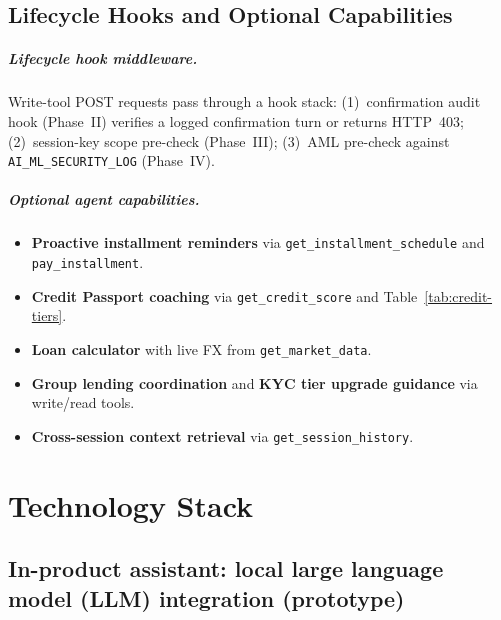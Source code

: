 \documentclass[12pt,a4paper]{report}
\begin{document}
\section{Lifecycle Hooks and Optional Capabilities}

\paragraph{Lifecycle hook middleware.}
Write-tool POST requests pass through a hook stack: (1)~confirmation audit hook (Phase~II) verifies a logged confirmation turn or returns HTTP~403; (2)~session-key scope pre-check (Phase~III); (3)~AML pre-check against \texttt{AI\_ML\_SECURITY\_LOG} (Phase~IV).

\paragraph{Optional agent capabilities.}
\begin{itemize}[noitemsep]
\item \textbf{Proactive installment reminders} via \texttt{get\_installment\_schedule} and \texttt{pay\_installment}.
\item \textbf{Credit Passport coaching} via \texttt{get\_credit\_score} and Table~\ref{tab:credit-tiers}.
\item \textbf{Loan calculator} with live FX from \texttt{get\_market\_data}.
\item \textbf{Group lending coordination} and \textbf{KYC tier upgrade guidance} via write/read tools.
\item \textbf{Cross-session context retrieval} via \texttt{get\_session\_history}.
\end{itemize}

\chapter{Technology Stack}

\section{In-product assistant: local large language model (LLM) integration (prototype)}
\label{sec:local-llm}
\end{document}
